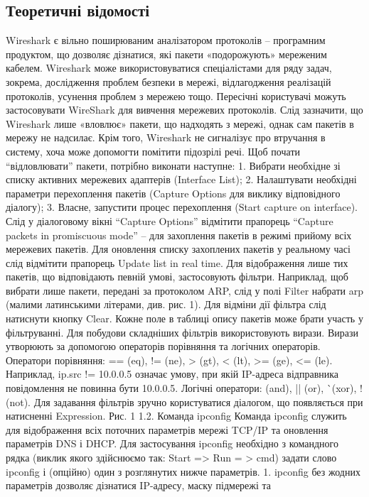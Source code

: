 \documentclass[12pt]{extarticle}
\begin{document}
\break
\subsection*{Теоретичні відомості}
Wireshark є вільно поширюваним аналізатором протоколів – програмним
продуктом, що дозволяє дізнатися, які пакети «подорожують» мереженим кабелем.
Wireshark може використовуватися спеціалістами для ряду задач, зокрема, дослідження
проблем безпеки в мережі, відлагодження реалізацій протоколів, усунення проблем з
мережею тощо. Пересічні користувачі можуть застосовувати WireShark для вивчення
мережевих протоколів. Слід зазначити, що Wireshark лише «вловлює» пакети, що
надходять з мережі, однак сам пакетів в мережу не надсилає. Крім того, Wireshark не
сигналізує про втручання в систему, хоча може допомогти помітити підозрілі речі.
Щоб почати “відловлювати” пакети, потрібно виконати наступне:
1. Вибрати необхідне зі списку активних мережевих адаптерів (Interface List);
2. Налаштувати необхідні параметри перехоплення пакетів (Capture Options для виклику
відповідного діалогу);
3. Власне, запустити процес перехоплення (Start capture on interface).
Слід у діалоговому вікні “Capture Options” відмітити прапорець “Capture packets in
promiscuous mode” – для захоплення пакетів в режимі прийому всіх мережевих пакетів.
Для оновлення списку захоплених пакетів у реальному часі слід відмітити прапорець
Update list in real time.
Для відображення лише тих пакетів, що відповідають певній умові, застосовують
фільтри. Наприклад, щоб вибрати лише пакети, передані за протоколом ARP, слід у полі
Filter набрати arp (малими латинськими літерами, див. рис. 1). Для відміни дії фільтра
слід натиснути кнопку Clear. Кожне поле в таблиці опису пакетів може брати участь у
фільтруванні. Для побудови складніших фільтрів використовують вирази. Вирази
утворюють за допомогою операторів порівняння та логічних операторів. Оператори
порівняння: == (eq), != (ne), > (gt), < (lt), >= (ge), <= (le). Наприклад, ip.src != 10.0.0.5
означає умову, при якій IP-адреса відправника повідомлення не повинна бути 10.0.0.5.
Логічні оператори:  (and), || (or), ^^ (xor), ! (not). Для задавання фільтрів зручно
користуватися діалогом, що появляється при натисненні Expression.
Рис. 1
1.2. Команда ipconfig
Команда ipconfig служить для відображення всіх поточних параметрів мережі
TCP/IP та оновлення параметрів DNS і DHCP. Для застосування ipconfig необхідно з
командного рядка (виклик якого здійснюємо так: Start => Run = > cmd) задати слово
ipconfig і (опційно) один з розглянутих нижче параметрів.
1. ipconfig без жодних параметрів дозволяє дізнатися IP-адресу, маску підмережі та
\end{document}
